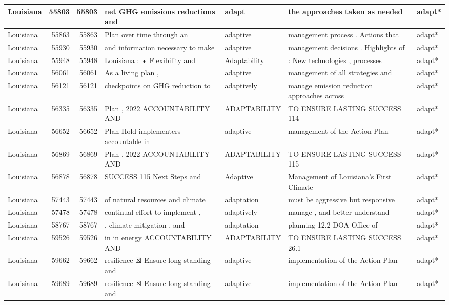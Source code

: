 \documentclass[
]{article}
\begin{document}
\begin{table}
\begin{tabular}[t]{l|r|r|l|l|l|l}
\hline
Louisiana & 55803 & 55803 & net GHG emissions reductions and & adapt & the approaches taken as needed & adapt*\\
\hline
Louisiana & 55863 & 55863 & Plan over time through an & adaptive & management process . Actions that & adapt*\\
\hline
Louisiana & 55930 & 55930 & and information necessary to make & adaptive & management decisions . Highlights of & adapt*\\
\hline
Louisiana & 55948 & 55948 & Louisiana : • Flexibility and & Adaptability & : New technologies , processes & adapt*\\
\hline
Louisiana & 56061 & 56061 & As a living plan , & adaptive & management of all strategies and & adapt*\\
\hline
Louisiana & 56121 & 56121 & checkpoints on GHG reduction to & adaptively & manage emission reduction approaches across & adapt*\\
\hline
Louisiana & 56335 & 56335 & Plan , 2022 ACCOUNTABILITY AND & ADAPTABILITY & TO ENSURE LASTING SUCCESS 114 & adapt*\\
\hline
Louisiana & 56652 & 56652 & Plan Hold implementers accountable in & adaptive & management of the Action Plan & adapt*\\
\hline
Louisiana & 56869 & 56869 & Plan , 2022 ACCOUNTABILITY AND & ADAPTABILITY & TO ENSURE LASTING SUCCESS 115 & adapt*\\
\hline
Louisiana & 56878 & 56878 & SUCCESS 115 Next Steps and & Adaptive & Management of Louisiana’s First Climate & adapt*\\
\hline
Louisiana & 57443 & 57443 & of natural resources and climate & adaptation & must be aggressive but responsive & adapt*\\
\hline
Louisiana & 57478 & 57478 & continual effort to implement , & adaptively & manage , and better understand & adapt*\\
\hline
Louisiana & 58767 & 58767 & , climate mitigation , and & adaptation & planning 12.2 DOA Office of & adapt*\\
\hline
Louisiana & 59526 & 59526 & in in energy ACCOUNTABILITY AND & ADAPTABILITY & TO ENSURE LASTING SUCCESS 26.1 & adapt*\\
\hline
Louisiana & 59662 & 59662 & resilience ☒ Ensure long-standing and & adaptive & implementation of the Action Plan & adapt*\\
\hline
Louisiana & 59689 & 59689 & resilience ☒ Ensure long-standing and & adaptive & implementation of the Action Plan & adapt*\\

\end{tabular}
\end{table}
\end{document}
